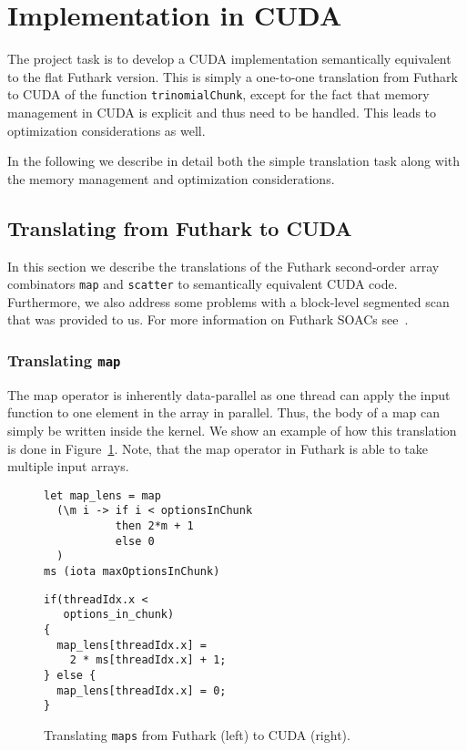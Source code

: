 \section{Implementation in CUDA}

The project task is to develop a CUDA implementation
semantically equivalent to the flat Futhark version. This is
simply a one-to-one translation from Futhark to CUDA of the
function \texttt{trinomialChunk}, except for the fact that
memory management in CUDA is explicit and thus need to be
handled. This leads to optimization considerations as well.

In the following we describe in detail both the simple
translation task along with the memory management and
optimization considerations.


\subsection{Translating from Futhark to CUDA}

In this section we describe the translations of the Futhark
second-order array combinators \texttt{map} and
\texttt{scatter} to semantically equivalent CUDA
code. Furthermore, we also address some problems with a
block-level segmented scan that was provided to us. For more
information on Futhark SOACs see~\cite{futharkdoc}.

\subsubsection{Translating \texttt{map}}

The map operator is inherently data-parallel as one thread
can apply the input function to one element in the array in
parallel. Thus, the body of a map can simply be written
inside the kernel. We show an example of how this
translation is done in Figure~\ref{fig:trans_map}. Note,
that the map operator in Futhark is able to take multiple
input arrays.
%
\begin{figure}[bt]
\begin{center}
\begin{minipage}[t]{0.45\linewidth}
\vspace{0pt}
\begin{lstlisting}
let map_lens = map
  (\m i -> if i < optionsInChunk
           then 2*m + 1
           else 0
  )
ms (iota maxOptionsInChunk)
\end{lstlisting}
\end{minipage}
\begin{minipage}[t]{0.45\linewidth}
\vspace{0pt}
\begin{lstlisting}
if(threadIdx.x <
   options_in_chunk)
{
  map_lens[threadIdx.x] =
    2 * ms[threadIdx.x] + 1;
} else {
  map_lens[threadIdx.x] = 0;
}
\end{lstlisting}
\end{minipage}
\caption{Translating \texttt{maps} from Futhark (left) to
  CUDA (right).}
\label{fig:trans_map}
\end{center}
\end{figure}
%




